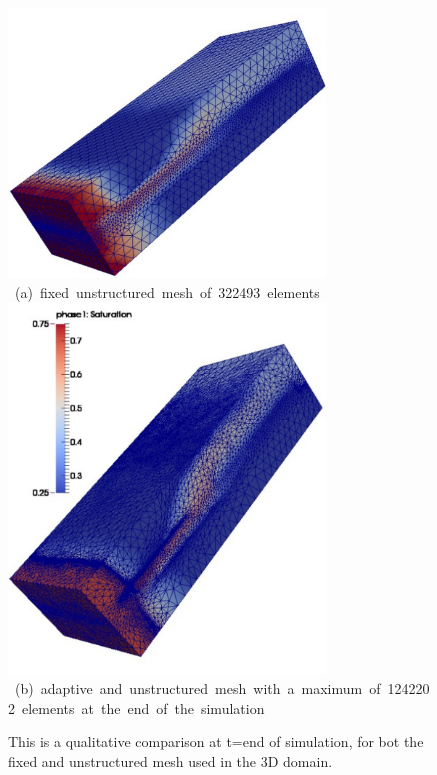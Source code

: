 \begin{figure}[ht] 
\vbox{\vspace{-3.5cm}
\vbox{\hspace{2.5cm}
\includegraphics[width=0.75\textwidth]{./Pics1/3D_Channel/3D_channel_sat_end.pdf} 
}
\vspace{0.0cm}
\hbox{\hspace{2.0cm} (a) fixed unstructured mesh of 322493 elements    
}
\hbox{\hspace{2.5cm}
\includegraphics[width=0.75\textwidth]{./Pics1/3D_Channel/3D_channel_sat_adapt_end.pdf}
}
\vspace{0.0cm}
\hbox{\hspace{-2.0cm} (b) adaptive and unstructured mesh with a maximum of 1242202 elements at the end of the simulation    
}
}     
\caption{This is a qualitative comparison at t=end of simulation, for bot the fixed and unstructured mesh used in the 3D domain.}
\end{figure}
\clearpage


